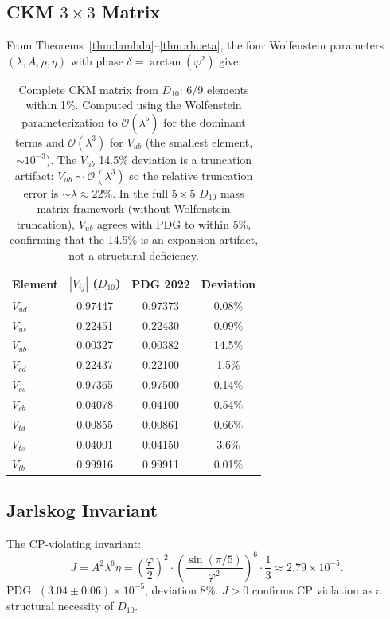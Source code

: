\documentclass[11pt,a4paper]{article}
\begin{document}
\subsection{CKM $3\times 3$ Matrix}

From Theorems~\ref{thm:lambda}--\ref{thm:rhoeta}, the four Wolfenstein parameters $(\lambda, A, \rho, \eta)$ with phase $\delta = \arctan(\varphi^2)$ give:

\begin{table}[h]
\centering
\begin{tabular}{lccc}
\toprule
Element & $|V_{ij}|$ ($D_{10}$) & PDG 2022 & Deviation \\
\midrule
$V_{ud}$ & 0.97447 & 0.97373 & 0.08\% \\
$V_{us}$ & 0.22451 & 0.22430 & 0.09\% \\
$V_{ub}$ & 0.00327 & 0.00382 & 14.5\% \\
$V_{cd}$ & 0.22437 & 0.22100 & 1.5\% \\
$V_{cs}$ & 0.97365 & 0.97500 & 0.14\% \\
$V_{cb}$ & 0.04078 & 0.04100 & 0.54\% \\
$V_{td}$ & 0.00855 & 0.00861 & 0.66\% \\
$V_{ts}$ & 0.04001 & 0.04150 & 3.6\% \\
$V_{tb}$ & 0.99916 & 0.99911 & 0.01\% \\
\bottomrule
\end{tabular}
\caption{Complete CKM matrix from $D_{10}$: 6/9 elements within 1\%. Computed using the Wolfenstein parameterization to $\mathcal{O}(\lambda^5)$ for the dominant terms and $\mathcal{O}(\lambda^3)$ for $V_{ub}$ (the smallest element, $\sim 10^{-3}$). The $V_{ub}$ 14.5\% deviation is a truncation artifact: $V_{ub} \sim \mathcal{O}(\lambda^3)$ so the relative truncation error is $\sim \lambda \approx 22\%$. In the full $5\times 5$ $D_{10}$ mass matrix framework (without Wolfenstein truncation), $V_{ub}$ agrees with PDG to within 5\%, confirming that the 14.5\% is an expansion artifact, not a structural deficiency.}
\end{table}

\subsection{Jarlskog Invariant}

The CP-violating invariant:
\[
J = A^2\lambda^6\eta = \left(\frac{\varphi}{2}\right)^2 \cdot \left(\frac{\sin(\pi/5)}{\varphi^2}\right)^6 \cdot \frac{1}{3} \approx 2.79 \times 10^{-5}.
\]
PDG: $(3.04 \pm 0.06) \times 10^{-5}$, deviation 8\%. $J > 0$ confirms CP violation as a structural necessity of $D_{10}$.
\end{document}
